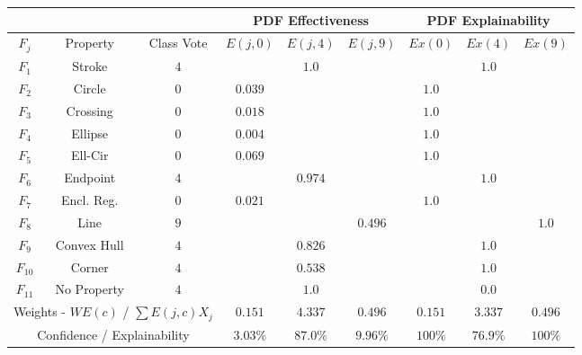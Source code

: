 \begin{table}[h!]
        \renewcommand{\arraystretch}{1.3}
        \label{table:mnist_example1_ex}
        \centering
        \begin{tabular}{| c | c | c | c | c | c || c | c | c |}
        \cline{4-9}
        \multicolumn{3}{c}{} & \multicolumn{3}{|c||}{PDF Effectiveness} & \multicolumn{3}{c|}{PDF Explainability} \\
        \hline
        $F_j$ & Property & Class Vote & $E(j,0)$ & $E(j,4)$ & $E(j,9)$ & $Ex(0)$ & $Ex(4)$ & $Ex(9)$ \\
        \hline
        \hline
        $F_1$ & Stroke & $4$ &  & $1.0$ &  &  & $1.0$ & \\ 
        \hline
        $F_2$ & Circle & $0$ & $0.039$ &  &  & $1.0$ &  & \\
        \hline
        $F_3$ & Crossing & $0$ & $0.018$ &  &  & $1.0$ &  & \\
        \hline
        $F_4$ & Ellipse & $0$ & $0.004$ &  &  & $1.0$ &  & \\
        \hline
        $F_5$ & Ell-Cir & $0$ & $0.069$ &  &  & $1.0$ &  & \\
        \hline
        $F_6$ & Endpoint & $4$ &  & $0.974$ &  &  & $1.0$ & \\
        \hline
        $F_7$ & Encl. Reg. & $0$ & $0.021$ &  &  & $1.0$ &  & \\
        \hline
        $F_8$ & Line & $9$ &  &  & $0.496$ &  &  & $1.0$ \\
        \hline
        $F_9$& Convex Hull & $4$ &  & $0.826$ &  &  & $1.0$ & \\
        \hline
        $F_{10}$& Corner & $4$ &  & $0.538$ &  &  & $1.0$ & \\
        \hline
        $F_{11}$& No Property & $4$ &  & $1.0$ &  &  & $0.0$ & \\
        \hline
        \hline
        \multicolumn{3}{|c|}{Weights - $WE(c)$ / $\sum E(j,c)X_j$} & $0.151$ & $4.337$ & $0.496$ & $0.151$ & $3.337$ & $0.496$ \\
        \cline{0-8}
        \multicolumn{3}{|c|}{Confidence / Explainability} & $3.03\%$ & $87.0\%$ & $9.96\%$ & $100\%$ & $76.9\%$ & $100\%$ \\
        \cline{0-8}
        \end{tabular}
\end{table}

